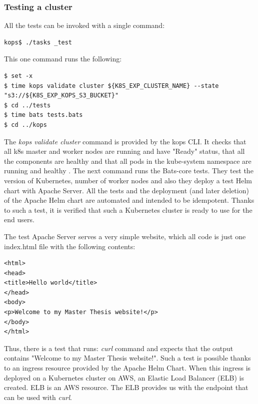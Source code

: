 \subsubsection{Testing a cluster}
\label{kops-testing}
All the tests can be invoked with a single command:
\begin{lstlisting}[basicstyle=\tiny,caption={Testing a kops cluster}]
kops$ ./tasks _test
\end{lstlisting}

This one command runs the following:
\begin{lstlisting}[basicstyle=\tiny,caption={Testing a kops cluster - deeper dive}]
$ set -x
$ time kops validate cluster ${K8S_EXP_CLUSTER_NAME} --state "s3://${K8S_EXP_KOPS_S3_BUCKET}"
$ cd ../tests
$ time bats tests.bats
$ cd ../kops
\end{lstlisting}

The \textit{kops validate cluster} command is provided by the kops CLI. It checks that all k8s master and worker nodes are running and have "Ready" status, that all the components are healthy and that all pods in the kube-system namespace are running and healthy \cite{online-kops-valid}. The next command runs the Bats-core tests. They test the version of Kubernetes, number of worker nodes and also they deploy a test Helm chart with Apache Server. All the tests and the deployment (and later deletion) of the Apache Helm chart are automated and intended to be idempotent. Thanks to such a test, it is verified that such a Kubernetes cluster is ready to use for the end users.

The test Apache Server serves a very simple website, which all code is just one index.html file with the following contents:
\begin{lstlisting}[basicstyle=\tiny,caption={Contents of a test application - Apache web server}]
<html>
<head>
<title>Hello world</title>
</head>
<body>
<p>Welcome to my Master Thesis website!</p>
</body>
</html>
\end{lstlisting}
Thus, there is a test that runs: \textit{curl} command and expects that the output contains "Welcome to my Master Thesis website!". Such a test is possible thanks to an ingress resource provided by the Apache Helm Chart. When this ingress is deployed on a Kubernetes cluster on AWS, an Elastic Load Balancer (ELB) is created. ELB is an AWS resource. The ELB provides us with the endpoint that can be used with \textit{curl}.

